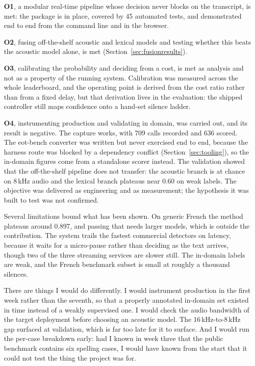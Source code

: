 \textbf{O1}, a modular real-time pipeline whose decision never blocks on the transcript, is
met: the package is in place, covered by 45 automated tests, and demonstrated end to end
from the command line and in the browser.

\textbf{O2}, fusing off-the-shelf acoustic and lexical models and testing whether this beats
the acoustic model alone, is met (Section~\ref{sec:fusionresults}).

\textbf{O3}, calibrating the probability and deciding from a cost, is met as analysis and
not as a property of the running system. Calibration was measured across the whole
leaderboard, and the operating point is derived from the cost ratio rather than from a fixed
delay, but that derivation lives in the evaluation: the shipped controller still maps
confidence onto a hand-set silence ladder.

\textbf{O4}, instrumenting production and validating in domain, was carried out, and its
result is negative. The capture works, with 709 calls recorded and 636 scored. The eot-bench converter was
written but never exercised end to end, because the harness route was blocked by a
dependency conflict (Section~\ref{sec:tooling}), so the in-domain figures come from a
standalone scorer instead. The validation showed that the off-the-shelf pipeline does not transfer: the
acoustic branch is at chance on 8\,kHz audio and the lexical branch plateaus near 0.60 on
weak labels. The objective was delivered as engineering and as measurement; the hypothesis
it was built to test was not confirmed.

Several limitations bound what has been shown. On generic French the method plateaus around
0.897, and passing that needs larger models, which is outside the contribution. The system trails the fastest commercial detectors on latency, because it waits for a
micro-pause rather than deciding as the text arrives, though two of the three streaming
services are slower still. The in-domain labels are weak, and the French
benchmark subset is small at roughly a thousand silences.

There are things I would do differently. I would instrument production in the first week rather
than the seventh, so that a properly annotated in-domain set existed in time instead of a
weakly supervised one. I would check the audio bandwidth of the target deployment before choosing an acoustic
model. The 16\,kHz-to-8\,kHz gap surfaced at validation, which is far too late for it to
surface.
And I would run the per-case breakdown early: had I known in week three that the public
benchmark contains six spelling cases, I would have known from the start that it could not
test the thing the project was for.

